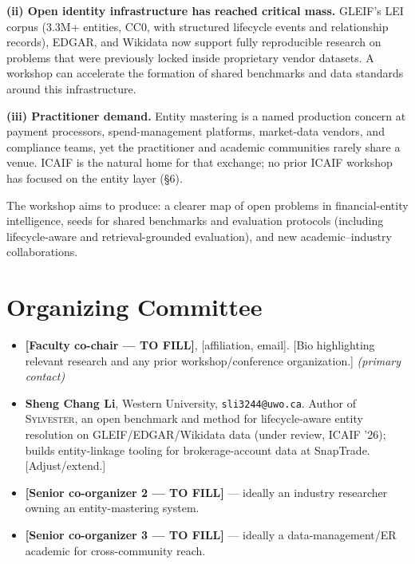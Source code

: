 \documentclass[12pt]{article}
\begin{document}
\textbf{(ii) Open identity infrastructure has reached critical mass.}
GLEIF's LEI corpus (3.3M+ entities, CC0, with structured lifecycle
events and relationship records), EDGAR, and Wikidata now support
fully reproducible research on problems that were previously locked
inside proprietary vendor datasets. A workshop can accelerate the
formation of shared benchmarks and data standards around this
infrastructure.

\textbf{(iii) Practitioner demand.} Entity mastering is a named
production concern at payment processors, spend-management platforms,
market-data vendors, and compliance teams, yet the practitioner and
academic communities rarely share a venue. ICAIF is the natural home
for that exchange; no prior ICAIF workshop has focused on the entity
layer (\S6).

The workshop aims to produce: a clearer map of open problems in
financial-entity intelligence, seeds for shared benchmarks and
evaluation protocols (including lifecycle-aware and
retrieval-grounded evaluation), and new academic--industry
collaborations.

\section{Organizing Committee}


\begin{itemize}
  \item \textbf{[Faculty co-chair — TO FILL]}, [affiliation, email].
        [Bio highlighting relevant research and any prior
        workshop/conference organization.] \emph{(primary contact)}
  \item \textbf{Sheng Chang Li}, Western University,
        \texttt{sli3244@uwo.ca}. Author of \textsc{Sylvester}, an open
        benchmark and method for lifecycle-aware entity resolution on
        GLEIF/EDGAR/Wikidata data (under review, ICAIF '26); builds
        entity-linkage tooling for brokerage-account data at
        SnapTrade. [Adjust/extend.]
  \item \textbf{[Senior co-organizer 2 — TO FILL]} --- ideally an
        industry researcher owning an entity-mastering system.
  \item \textbf{[Senior co-organizer 3 — TO FILL]} --- ideally a
        data-management/ER academic for cross-community reach.
\end{itemize}
\end{document}
